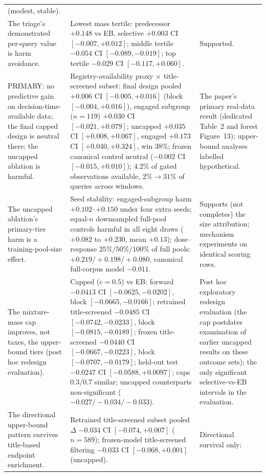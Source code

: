 \documentclass[11pt]{article}
\begin{document}
\begin{longtable}{p{} p{} p{}}
(modest, stable). \\
The triage's demonstrated per-query value is harm avoidance. & Lowest mass
tertile: predecessor $+0.148$ vs EB, selective $+0.003$ CI $[-0.007,+0.012]$;
middle tertile $-0.054$ CI $[-0.089,-0.019]$; top tertile $-0.029$ CI
$[-0.117,+0.060]$. & Supported. \\
PRIMARY: no predictive gain on decision-time-available data; the final
capped design is neutral there; the uncapped ablation is harmful. &
Registry-availability proxy $\times$ title-screened subset: final design
pooled $+0.006$ CI $[-0.005,+0.016]$ (block $[-0.004,+0.016]$), engaged
subgroup ($n=119$) $+0.030$ CI $[-0.021,+0.079]$; uncapped $+0.035$ CI
$[+0.008,+0.067]$, engaged $+0.173$ CI $[+0.040,+0.324]$, win $38\%$;
frozen canonical control neutral ($-0.002$ CI $[-0.015,+0.010]$); $4.2\%$
of gated observations available, $2\%\to31\%$ of queries across windows. &
The paper's primary real-data result (dedicated Table~2 and forest
Figure~13); upper-bound analyses labelled hypothetical. \\
The uncapped ablation's primary-tier harm is a training-pool-size effect. &
Seed stability: engaged-subgroup harm $+0.102$--$+0.150$ under four extra
seeds; equal-$n$ downsampled full-pool controls harmful in all eight draws
($+0.082$ to $+0.230$, mean $+0.13$); dose--response $25\%/50\%/100\%$ of
full pools:
$+0.219/+0.198/+0.080$, canonical full-corpus model $-0.011$. & Supports
(not completes) the size attribution; mechanism experiments on identical
scoring rows. \\
The mixture-mass cap improves, not taxes, the upper-bound tiers (post hoc
redesign evaluation). & Capped
($c=0.5$) vs EB: forward $-0.0413$ CI $[-0.0625,-0.0202]$, block
$[-0.0665,-0.0166]$; retrained
title-screened $-0.0485$ CI $[-0.0742,-0.0233]$, block
$[-0.0815,-0.0189]$; frozen title-screened
$-0.0440$ CI $[-0.0667,-0.0223]$, block $[-0.0707,-0.0179]$; held-out
test $-0.0247$ CI
$[-0.0588,+0.0097]$; caps $0.3/0.7$ similar; uncapped counterparts
non-significant ($-0.027/-0.034/-0.033$). & Post hoc exploratory redesign
evaluation (the cap postdates examination of earlier uncapped results on
these outcome sets); the only significant selective-vs-EB intervals in
the evaluation. \\
The directional upper-bound pattern survives title-based endpoint
enrichment. &
Retrained title-screened subset pooled $\Delta$ $-0.034$ CI
$[-0.074,+0.007]$ ($n=589$); frozen-model title-screened filtering
$-0.033$ CI $[-0.068,+0.001]$ (uncapped). & Directional survival only:

\end{longtable}
\end{document}
